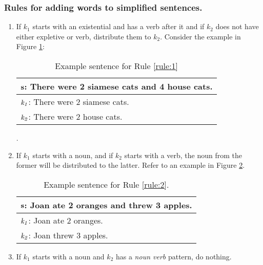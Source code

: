 \documentclass[11pt]{article}
\begin{document}
\subsubsection{Rules for adding words to simplified sentences.}\label{sec:secondsentencesimplification}
\begin{enumerate}[topsep=0pt,itemsep=-1ex,partopsep=1ex,parsep=1ex]
\item \label{rule:1}
If $\mathit{k_{1}}$ starts with an existential and has a verb after it and if $\mathit{k_{2}}$ does not have either expletive or verb, distribute them to $\mathit{k_{2}}$. Consider the example in Figure \ref{figure:3}:
\vspace{0.65cm}
\begin{table}[h!]
\centering
\begin{tabular}{ | m{7cm} | }
\hline
 $\mathbf{\small s}$\textbf{\small : There were 2 siamese cats and 4 house cats.}\\
\hline
$\mathit{\small k_{1}}$\small : There were 2 siamese cats.\\
\hline
$\mathit{\small k_{2}}$\small : There were 2 house cats.\\
\hline
\end{tabular}
\caption{Example sentence for Rule \ref{rule:1}}.
\label{figure:3}
\end{table}
\vspace{-1.20cm}
\item \label{rule:2}
\vspace{1.1cm}
If $\mathit{k_{1}}$ starts with a noun, and if $\mathit{k_{2}}$ starts with a verb, the noun from the former will be distributed to the latter. Refer to an example in Figure \ref{figure:4}.
\vspace{-0.2cm}
\begin{table}[h!]
\centering
\begin{tabular}{ | m{7cm} | }
\hline
 $\mathbf{\small s}$\textbf{\small : Joan ate 2 oranges and threw 3 apples.}\\
\hline
$\mathit{\small k_{1}}$\small : Joan ate 2 oranges.\\
\hline
$\mathit{\small k_{2}}$\small : Joan threw 3 apples.\\
\hline
\end{tabular}
\caption{Example sentence for Rule \ref{rule:2}.}
\label{figure:4}
\end{table}
\vspace{0.5cm}
\item  \label{rule:3}
If $\mathit{k_{1}}$ starts with a noun and $\mathit{k_{2}}$ has a \textit{noun verb} pattern, do nothing.

\end{enumerate}
\end{document}
